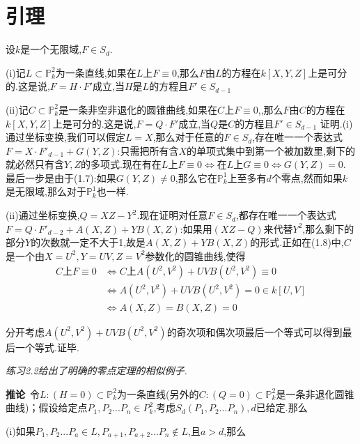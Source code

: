 \documentclass[UTF8]{book}
\begin{document}
	\section{引理}
		设$ k $是一个无限域,$F \in S_{d}$.
		
		
		(i)记$L\subset \mathbb{P}^{2}_{k}$为一条直线,如果在$ L $上$F\equiv 0$,那么$ F $由$ L $的方程在$ k[X,Y,Z] $上是可分的.这是说,$ F=H·F' $成立,当$ H $是$ L $的方程且$F'\in S_{d-1}$
		
		
		(ii)记$C\subset \mathbb{P}^{2}_{k}$是一条非空非退化的圆锥曲线,如果在$ C $上$ F \equiv 0 $,,那么$ F $由$ C $的方程在$ k[X,Y,Z] $上是可分的.这是说,$ F=Q·F' $成立,当$ Q $是$ C $的方程且$F' \in S_{d-1}$
		证明.(i)通过坐标变换,我们可以假定$ L=X $,那么对于任意的$F \in S_{d}$,存在唯一一个表达式$F=X· F'_{d-1} +G(Y,Z)$:只需把所有含$ X $的单项式集中到第一个被加数里,剩下的就必然只有含$ Y,Z $的多项式.现在有在$ L $上$F \equiv 0 \Leftrightarrow$在$ L $上$G \equiv 0\Leftrightarrow G(Y,Z)=0$. 最后一步是由于(1.7):如果$ G(Y,Z) \ne 0 $,那么它在$\mathbb{P}^{1}_{k}$上至多有$ d $个零点,然而如果$ k $是无限域,那么对于$\mathbb{P}^{1}_{k}$也一样.
		
		
		(ii)通过坐标变换,$Q=XZ-Y^{2}$.现在证明对任意$F\in S_{d}$,都存在唯一一个表达式$ F=Q·F'_{d-2}+A(X,Z)+YB(X,Z) $:如果用$ (XZ-Q) $来代替$Y^{2}$,那么剩下的部分$ Y $的次数就一定不大于1,故是$ A(X,Z)+YB(X,Z) $的形式.正如在(1.8)中,$ C $是一个由$X=U^{2},Y=UV,Z=V^{2}$参数化的圆锥曲线,使得
		\begin{equation*}
		\begin{split}
		C\text{上}F\equiv0&\Leftrightarrow C\text{上}A(U^{2},V^{2})+UVB(U^{2},V^{2})\equiv0\\
		&\Leftrightarrow A(U^{2},V^{2})+UVB(U^{2},V^{2})=0\in k[U,V]\\
		&\Leftrightarrow A(X,Z)=B(X,Z)=0
		\end{split}
		\end{equation*}
		
		分开考虑$ A(U^{2},V^{2})+UVB(U^{2},V^{2}) $的奇次项和偶次项最后一个等式可以得到最后一个等式.证毕.
		
		
		\textit{练习2.2给出了明确的零点定理的相似例子.}
		
		\textbf{推论}\ 令$L:(H=0)\subset \mathbb{P}^{2}_{k}$为一条直线(另外的$C:(Q=0) \subset \mathbb{P}^{2}_{k}$是一条非退化圆锥曲线)；假设给定点$P_{1},P_{2} ... P_{n} \in P^{2}_{k}$,考虑$S_{d}(P_{1},P_{2} ... P_{n}),d$已给定.那么
		
		(i)如果$P_{1},P_{2} ... P_{a} \in L, P_{a+1},P_{a+2} ... P_{n} \notin L$,且$ a>d $,那么
		
\end{document}
